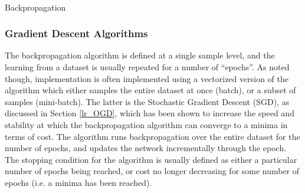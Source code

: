 \documentclass[a4paper,11pt,oneside]{article}
\theoremstyle{plain}
\theoremstyle{definition}
\begin{document}
	\begin{algorithm}[H]
		
		\texttt{\\}
		
		
		\label{algo_backprop}
		\caption{Backpropagation}
	\end{algorithm}
	
	
	
	
	\subsubsection{Gradient Descent Algorithms}\label{imp_sgd}
	
	The backpropagation algorithm is defined at a single sample level, and the learning from a dataset is usually repeated for a number of ``epochs''. As noted though, implementation is often implemented using a vectorized version of the algorithm which either samples the entire dataset at once (batch), or a subset of samples (mini-batch). The latter is the Stochastic Gradient Descent (SGD), as discussed in Section \ref{lr_OGD}, which has been shown to increase the speed and stability at which the backpropagation algorithm can converge to a minima in terms of cost. The algorithm runs backpropagation over the entire dataset for the number of epochs, and updates the network incrementally through the epoch. The stopping condition for the algorithm is usually defined as either a particular number of epochs being reached, or cost no longer decreasing for some number of epochs (i.e. a minima has been reached).\newline
	
\end{document}
